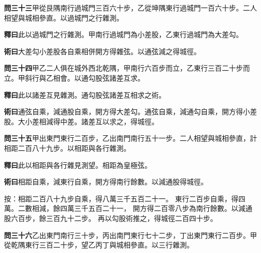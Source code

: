 \documentclass[12pt,a4paper]{article}
\begin{document}
\noindent\textbf{問三十三}\quad 甲從艮隅南行過城門三百六十步，乙從坤隅東行過城門一百六十步。二人相望與城相參直。以過城門之行雜測。

\vspace{0.3em}

\noindent\textbf{釋曰}\quad 此以過城門之行雜測。甲南行過城門為小差股，乙東行過城門為大差勾。

\vspace{0.3em}

\noindent\textbf{術曰}\quad 大差勾小差股各自乘相併開方得雜弦。以通弦減之得城徑。

\vspace{0.5em}

\noindent\textbf{問三十四}\quad 甲乙二人俱在城外西北乾隅，甲南行六百步而立，乙東行三百二十步而立。甲斜行與乙相會。以通勾股弦諸差互求。

\vspace{0.3em}

\noindent\textbf{釋曰}\quad 此以諸差互見雜測。通勾股弦諸差互相求之術。

\vspace{0.3em}

\noindent\textbf{術曰}\quad 通弦自乘，減通股自乘，開方得大差勾。通弦自乘，減通勾自乘，開方得小差股。大小差相減得中差。諸差互以求之，得城徑。

\vspace{0.5em}

\noindent\textbf{問三十五}\quad 甲出東門東行二百步，乙出南門南行五十一步。二人相望與城相參直，計相距二百八十九步。以相距與各行雜測。

\vspace{0.3em}

\noindent\textbf{釋曰}\quad 此以相距與各行雜見測望。相距為皇極弦。

\vspace{0.3em}

\noindent\textbf{術曰}\quad 相距自乘，減東行自乘，開方得南行餘數。以減通股得城徑。

\vspace{0.3em}

\noindent
按：相距二百八十九步自乘，得八萬三千五百二十一。
東行二百步自乘，得四萬。二數相減，餘四萬三千五百二十一，
開方得二百零八步為南行餘數。以減通股六百步，餘三百九十二步。
再以勾股術推之，得城徑二百四十步。

\vspace{0.5em}

\noindent\textbf{問三十六}\quad 乙出東門南行三十步，丙出南門東行七十二步，丁出東門東行二百步。甲從乾隅東行三百二十步，望乙丙丁與城相參直。以三行雜測。
\end{document}
